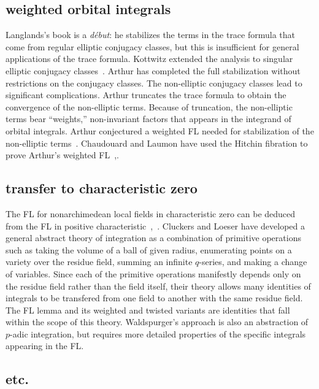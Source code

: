 \documentclass[brochure,english,12pt]{bourbaki}
\theoremstyle{plain}
\begin{document}
\subsection{weighted orbital integrals}

Langlands's book is a {\it d\'ebut}: he
stabilizes the terms in the trace formula that come from regular
elliptic conjugacy classes, but  this is insufficient for general
applications of the trace formula.  Kottwitz extended the analysis to
singular elliptic conjugacy classes~\cite{Kott:singular}.  Arthur has
completed the full stabilization without restrictions on the conjugacy
classes.  The non-elliptic conjugacy classes lead to significant
complications.  Arthur truncates the trace formula to obtain the
convergence of the non-elliptic terms.  Because of truncation, the
non-elliptic terms bear ``weights,'' non-invariant factors that
appears in the integrand of orbital integrals.  Arthur conjectured a
weighted FL needed for stabilization of the non-elliptic
terms~\cite{Arthur:2002}.  Chaudouard and Laumon have used the Hitchin
fibration to prove Arthur's weighted
FL~\cite{CL:2009:I},\cite{CL:2009:II}.  


\subsection{transfer to characteristic zero}

The FL for nonarchimedean local fields in characteristic zero can be
deduced from the FL in positive
characteristic~\cite{Wald:2006},~\cite{CHL:2010}.  Cluckers and Loeser
have developed a general abstract theory of integration as a
combination of primitive operations such as taking the volume of a
ball of given radius, enumerating points on a variety over the residue
field, summing an infinite $q$-series, and making a change of
variables.  Since each of the primitive operations manifestly depends
only on the residue field rather than the field itself, their theory
allows many identities of integrals to be transfered from one field to
another with the same residue field.  The FL lemma and its weighted
and twisted variants are identities that fall within the scope of this
theory.  Waldspurger's approach is also an abstraction
of $p$-adic integration, but requires more detailed
properties of the specific integrals appearing in the FL.

\subsection{etc.}
\end{document}
